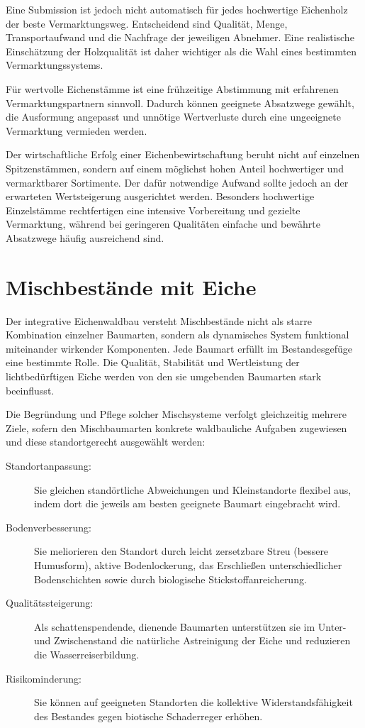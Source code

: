 \documentclass[twocolumn, bibliography=totoc, abstract=true]{scrartcl}
\begin{document}
Eine Submission ist jedoch nicht automatisch für jedes hochwertige Eichenholz der beste Vermarktungsweg. Entscheidend sind Qualität, Menge, Transportaufwand und die Nachfrage der jeweiligen Abnehmer. Eine realistische Einschätzung der Holzqualität ist daher wichtiger als die Wahl eines bestimmten Vermarktungssystems.

Für wertvolle Eichenstämme ist eine frühzeitige Abstimmung mit erfahrenen Vermarktungspartnern sinnvoll. Dadurch können geeignete Absatzwege gewählt, die Ausformung angepasst und unnötige Wertverluste durch eine ungeeignete Vermarktung vermieden werden.

Der wirtschaftliche Erfolg einer Eichenbewirtschaftung beruht nicht auf einzelnen Spitzenstämmen, sondern auf einem möglichst hohen Anteil hochwertiger und vermarktbarer Sortimente. Der dafür notwendige Aufwand sollte jedoch an der erwarteten Wertsteigerung ausgerichtet werden. Besonders hochwertige Einzelstämme rechtfertigen eine intensive Vorbereitung und gezielte Vermarktung, während bei geringeren Qualitäten einfache und bewährte Absatzwege häufig ausreichend sind.


\section{Mischbestände mit Eiche}

Der integrative Eichenwaldbau versteht Mischbestände nicht als starre Kombination einzelner Baumarten, sondern als dynamisches System funktional miteinander wirkender Komponenten. Jede Baumart erfüllt im Bestandesgefüge eine bestimmte Rolle. Die Qualität, Stabilität und Wertleistung der lichtbedürftigen Eiche werden von den sie umgebenden Baumarten stark beeinflusst.

Die Begründung und Pflege solcher Mischsysteme verfolgt gleichzeitig mehrere Ziele, sofern den Mischbaumarten konkrete waldbauliche Aufgaben zugewiesen und diese standortgerecht ausgewählt werden:
\begin{description}
\item[Standortanpassung:] Sie gleichen standörtliche Abweichungen und Kleinstandorte flexibel aus, indem dort die jeweils am besten geeignete Baumart eingebracht wird.
\item[Bodenverbesserung:] Sie meliorieren den Standort durch leicht zersetzbare Streu (bessere Humusform), aktive Bodenlockerung, das Erschließen unterschiedlicher Bodenschichten sowie durch biologische Stickstoffanreicherung.
\item[Qualitätssteigerung:] Als schattenspendende, dienende Baumarten unterstützen sie im Unter- und Zwischenstand die natürliche Astreinigung der Eiche und reduzieren die Wasserreiserbildung.
\item[Risikominderung:] Sie können auf geeigneten Standorten die kollektive Widerstandsfähigkeit des Bestandes gegen biotische Schaderreger erhöhen.
\end{description}
\end{document}
